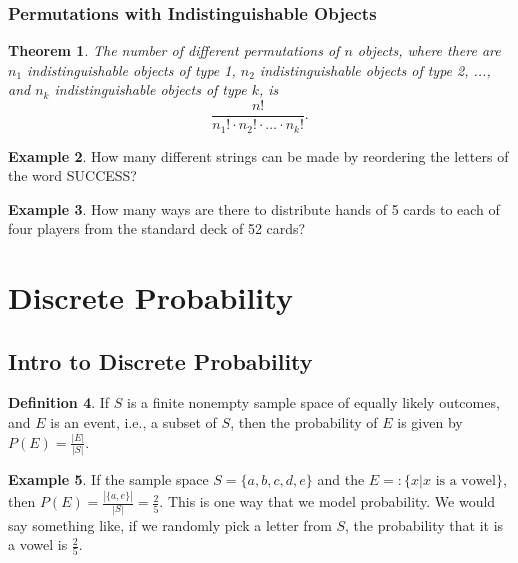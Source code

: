 \documentclass[letterpaper,10pt]{article}
\theoremstyle{plain}
\newtheorem{thm}{Theorem}[section]
\theoremstyle{definition}
\newtheorem{defn}[thm]{Definition}
\newtheorem{exmp}[thm]{Example}
\theoremstyle{remark}
\begin{document}
\subsubsection{Permutations with Indistinguishable Objects}

\begin{thm}
The number of different permutations of $n$ objects, where there are $n_1$ indistinguishable objects of type 1, $n_2$ indistinguishable objects of type 2, ..., and $n_k$ indistinguishable objects of type $k$, is
\[
\frac{n!}{n_1! \cdot n_2! \cdot \ldots \cdot n_k!}.
\]

\end{thm}

\begin{exmp}
How many different strings can be made by reordering the letters of the word SUCCESS?\vspace{3cm}
\end{exmp}


\begin{exmp}
How many ways are there to distribute hands of 5 cards to each of four players from the standard
deck of 52 cards?
\end{exmp}
\section{Discrete Probability}
\subsection{Intro to Discrete Probability}
\begin{defn}
    If $S$ is a finite nonempty sample space of equally likely outcomes, and $E$ is an event, i.e., a subset of $S$, then the probability of $E$ is given by $P(E) = \frac{|E|}{|S|}$.
\end{defn}

\begin{exmp}
If the sample space $S=\{a,b,c,d,e\}$ and the $E=:\{x| x \text{ is a vowel}\}$, then $P(E)=\frac{|\{a,e\}|}{|S|}=\frac{2}{5}$. 
\newline
This is one way that we model probability. We would say something like, if we randomly pick a letter from $S$, the probability that it is a vowel is $\frac{2}{5}$.
\newline

\end{exmp}
\end{document}
